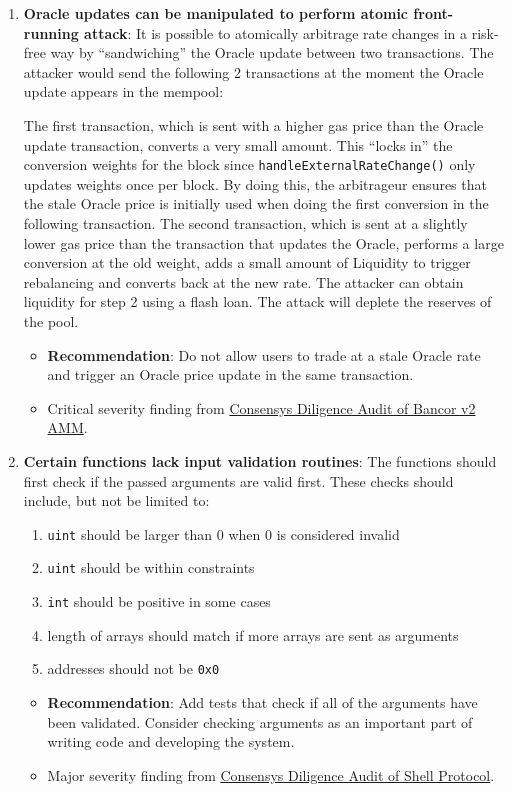 \begin{enumerate}
\item\textbf{Oracle updates can be manipulated to perform atomic front-running attack}: It is possible to atomically arbitrage rate changes in a risk-free way by “sandwiching” the Oracle update between two transactions. The attacker would send the following 2 transactions at the moment the Oracle update appears in the mempool:

The first transaction, which is sent with a higher gas price than the Oracle update transaction, converts a very small amount. This “locks in” the conversion weights for the block since \verb|handleExternalRateChange()| only updates weights once per block. By doing this, the arbitrageur ensures that the stale Oracle price is initially used when doing the first conversion in the following transaction. The second transaction, which is sent at a slightly lower gas price than the transaction that updates the Oracle, performs a large conversion at the old weight, adds a small amount of Liquidity to trigger rebalancing and converts back at the new rate. The attacker can obtain liquidity for step 2 using a flash loan. The attack will deplete the reserves of the pool.
	\begin{itemize}
	\item\textbf{Recommendation}: Do not allow users to trade at a stale Oracle rate and trigger an Oracle price update in the same transaction.
	\item Critical severity finding from \href{https://consensys.net/diligence/audits/2020/06/bancor-v2-amm-security-audit/\#oracle-updates-can-be-manipulated-to-perform-atomic-front-running-attack}{Consensys Diligence Audit of Bancor v2 AMM}.
	\end{itemize}

\item\textbf{Certain functions lack input validation routines}: The functions should first check if the passed arguments are valid first. These checks should include, but not be limited to:
    \begin{enumerate}
    \item\verb|uint| should be larger than 0 when 0 is considered invalid
    \item\verb|uint| should be within constraints
    \item\verb|int| should be positive in some cases
    \item length of arrays should match if more arrays are sent as arguments
    \item addresses should not be \verb|0x0|
    \end{enumerate}
	\begin{itemize}
	\item\textbf{Recommendation}: Add tests that check if all of the arguments have been validated. Consider checking arguments as an important part of writing code and developing the system.
	\item Major severity finding from \href{https://consensys.net/diligence/audits/2020/06/shell-protocol/\#certain-functions-lack-input-validation-routines}{Consensys Diligence Audit of Shell Protocol}.
	\end{itemize}


\end{enumerate}
